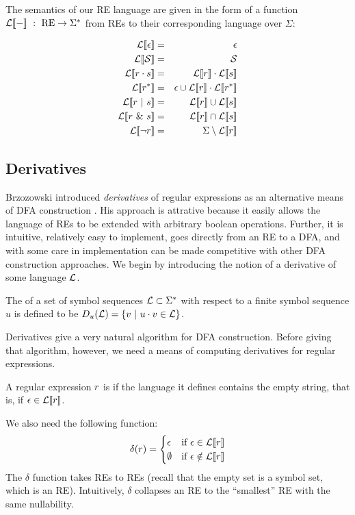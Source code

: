 The semantics of our RE language are given in the form of a function $\mathcal{L}[ \! [ - ] \! ] \ : \ \mathrm{RE} \rightarrow \Sigma^*$ from REs to their corresponding language over $\Sigma$:

\begin{eqnarray*}
\Ls{\epsilon} 	&=& 	\epsilon \\
\Ls{\CS}		&=& 	\CS \\
\Ls{r\cdot s}	&=& 	\Ls{r} \cdot \Ls{s} \\
\Ls{r^*}		&=& 	\epsilon \cup \Ls{r}\cdot\Ls{r^*} \\
\Ls{r \OR s}	&=&		\Ls{r} \cup \Ls{s} \\
\Ls{r \AND s}	&=& 	\Ls{r} \cap \Ls{s} \\
\Ls{\neg r}		&=& 	\Sigma \setminus \Ls{r}
\end{eqnarray*}

\subsection{Derivatives}\label{sec:derivatives}

Brzozowski introduced \emph{derivatives} of regular expressions as an alternative means of DFA construction \cite{derivatives}.  His approach is attrative because it easily allows the language of REs to be extended with arbitrary boolean operations.  Further, it is intuitive, relatively easy to implement, goes directly from an RE to a DFA, and with some care in implementation can be made competitive with other DFA construction approaches.  We begin by introducing the notion of a derivative of some language $\mathcal{L}$.

\begin{definition}  The  of a set of symbol sequences $\mathcal{L} \subset \Sigma^*$ with respect to a finite symbol sequence $u$ is defined to be $D_u(\mathcal{L}) = \{ v \ | \ u\cdot v \in \mathcal{L} \}$.
\end{definition} 

Derivatives give a very natural algorithm for DFA construction.  Before giving that algorithm, however, we need a means of computing derivatives for regular expressions.

\begin{definition} A regular expression $r$ is  if the language it defines contains the empty string, that is, if $\epsilon \in \mathcal{L}[ \! [ r ] \! ]$.
\end{definition}

We also need the following function:
\[ \delta(r) =
    \begin{cases}
        \epsilon & \textrm{if} \ \epsilon \in \mathcal{L}[ \! [ r ] \! ] \\
        \emptyset & \textrm{if} \ \epsilon \notin \mathcal{L}[ \! [ r ] \! ]
    \end{cases}
\]
The $\delta$ function takes REs to REs (recall that the empty set is a symbol set, which is an RE).  Intuitively, $\delta$ collapses an RE to the ``smallest'' RE with the same nullability.


